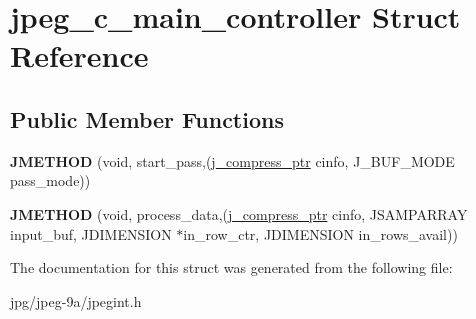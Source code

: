 \hypertarget{structjpeg__c__main__controller}{\section{jpeg\+\_\+c\+\_\+main\+\_\+controller Struct Reference}
\label{structjpeg__c__main__controller}
}
\subsection*{Public Member Functions}
\begin{DoxyCompactItemize}
\item 
\hypertarget{structjpeg__c__main__controller_a12d7c719a1598e04dafbddc0c3d6c1d5}{{\bfseries J\+M\+E\+T\+H\+O\+D} (void, start\+\_\+pass,(\hyperlink{structjpeg__compress__struct}{j\+\_\+compress\+\_\+ptr} cinfo, J\+\_\+\+B\+U\+F\+\_\+\+M\+O\+D\+E pass\+\_\+mode))}\label{structjpeg__c__main__controller_a12d7c719a1598e04dafbddc0c3d6c1d5}

\item 
\hypertarget{structjpeg__c__main__controller_aefb0f62e18af1d6087803ac65bfd9bb9}{{\bfseries J\+M\+E\+T\+H\+O\+D} (void, process\+\_\+data,(\hyperlink{structjpeg__compress__struct}{j\+\_\+compress\+\_\+ptr} cinfo, J\+S\+A\+M\+P\+A\+R\+R\+A\+Y input\+\_\+buf, J\+D\+I\+M\+E\+N\+S\+I\+O\+N $\ast$in\+\_\+row\+\_\+ctr, J\+D\+I\+M\+E\+N\+S\+I\+O\+N in\+\_\+rows\+\_\+avail))}\label{structjpeg__c__main__controller_aefb0f62e18af1d6087803ac65bfd9bb9}

\end{DoxyCompactItemize}


The documentation for this struct was generated from the following file\+:\begin{DoxyCompactItemize}
\item 
jpg/jpeg-\/9a/jpegint.\+h\end{DoxyCompactItemize}
